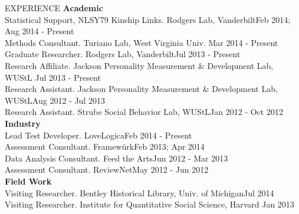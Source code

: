 \documentclass {resume}
\begin{document}
\begin{rSection}{\textrm{EXPERIENCE}}
{\large \textbf{Academic}}\\
Statistical Support, NLSY79 Kinship Links. Rodgers Lab, Vanderbilt\hfill Feb 2014; Aug 2014 - Present\smallskip\\
Methods Consultant. Turiano Lab, West Virginia Univ. \hfill Mar 2014 - Present\smallskip\\%
Graduate Researcher. Rodgers Lab, Vanderbilt\hfill Jul 2013 - Present\smallskip\\
Research Affiliate. Jackson Personality Measurement $\&$ Development Lab, WUStL \hfill Jul 2013 - Present\smallskip\\
Research Assistant. Jackson Personality Measurement $\&$ Development Lab, WUStL\hfill Aug 2012 - Jul 2013\smallskip\\
Research Assistant. Strube Social Behavior Lab, WUStL\hfill Jan 2012 - Oct 2012
\medskip\\
{\large \textbf{Industry}}\\
Lead Test Developer. LoveLogica\hfill Feb 2014 - Present\smallskip\\
Assessment Consultant. Framew\"{u}rk\hfill Feb 2013; Apr 2014\smallskip\\
Data Analysis Consultant. Feed the Arts\hfill Jun 2012 - Mar 2013\smallskip\\
Assessment Consultant. ReviewNet\hfill May 2012 - Jun 2012\medskip\\
{\large \textbf{Field Work}}\\
Visiting Researcher. Bentley Historical Library, Univ. of Michigan\hfill Jul 2014\smallskip\\
Visiting Researcher. Institute for Quantitative Social Science, Harvard \hfill Jan 2013%
\end{rSection}
\end{document}
